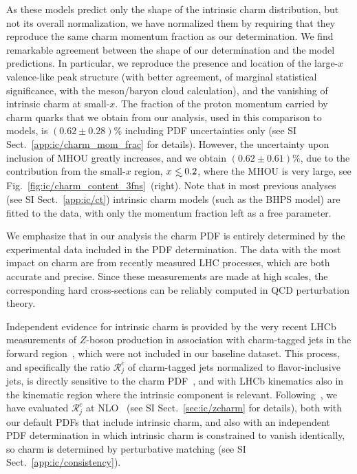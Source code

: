 \documentclass[11pt,a4paper]{article}
\newcommand{\lp}{\left(}
\newcommand{\rp}{\right)}
\def\lsim{\mathrel{\rlap{\lower4pt\hbox{\hskip1pt$\sim$}}
    \raise1pt\hbox{$<$}}}         %
\begin{document}
As these models predict only the shape of the
intrinsic charm distribution, but not 
its overall normalization, we have normalized them by requiring
that they reproduce the same 
charm momentum fraction as our determination.
%
We find remarkable agreement between the shape of our 
determination and the model predictions.
%
In particular, we reproduce  the presence and location of the large-$x$ valence-like peak
structure (with  better agreement, of marginal statistical significance, with
the meson/baryon cloud calculation),  and the vanishing of 
intrinsic charm at small-$x$.
%
The fraction of the proton momentum carried by charm quarks that we
obtain from our analysis, 
used in this comparison to models,  is $\lp 0.62 \pm 0.28\rp \%$
including PDF uncertainties only (see
SI Sect.~\ref{app:ic/charm_mom_frac} for details).
%
However, the uncertainty
upon inclusion of MHOU greatly increases, and we obtain
$\lp 0.62 \pm 0.61\rp \%$, due to the contribution from the small-$x$
region, $x\lsim 0.2$, where the MHOU is very large, see
Fig.~\ref{fig:ic/charm_content_3fns}~(right).
%
%
Note that in most previous
analyses~\cite{Hou:2017khm} (see SI Sect.~\ref{app:ic/ct}) intrinsic charm models (such as the BHPS
model) are fitted to the data, with only the momentum fraction left as
a free parameter.

We emphasize that in our analysis the charm PDF is entirely
determined by the experimental data included in the PDF determination.
The data with the most impact on charm are from recently measured LHC
processes, which are both accurate and precise.
%
Since these measurements are made at high scales, the corresponding
hard cross-sections can be reliably computed in QCD perturbation theory.

Independent evidence for intrinsic charm
is provided by the very recent LHCb measurements of $Z$-boson production
in association with charm-tagged jets in the forward
region~\cite{LHCb:2021stx}, which were not included in our baseline dataset.
%
This process, and specifically the ratio $\mathcal{R}_j^c$
of charm-tagged jets normalized to flavor-inclusive jets,
is directly sensitive to the charm PDF~\cite{Boettcher:2015sqn}, and
with LHCb kinematics also
in the kinematic region  where the  intrinsic component is relevant.
%
Following~\cite{Boettcher:2015sqn,LHCb:2021stx}, we have 
evaluated $\mathcal{R}_j^c$ at NLO~\cite{Alioli:2010xd,Sjostrand:2007gs}  
(see  SI Sect.~\ref{sec:ic/zcharm} for details), both with our default PDFs
that include intrinsic charm, and also with an independent PDF determination in
which intrinsic charm is constrained to vanish 
identically, so charm is determined by perturbative matching
(see SI Sect.~\ref{app:ic/consistency}).
\end{document}
